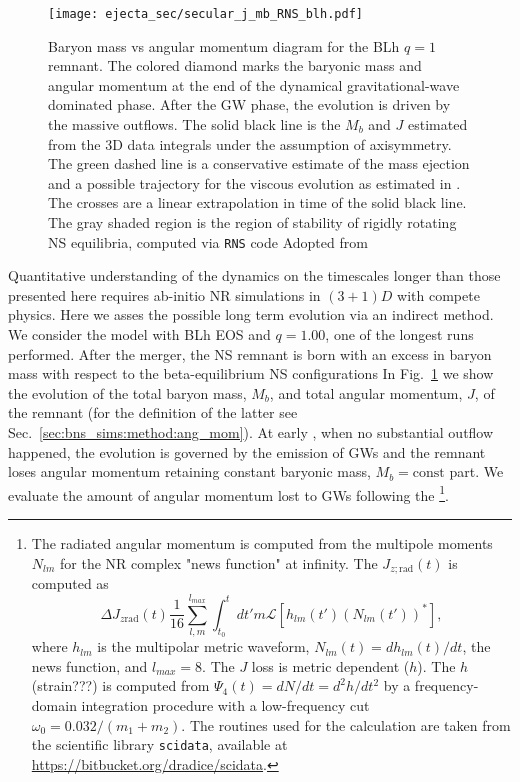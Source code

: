 \begin{figure}[t]
    \centering 
    \texttt{[image: ejecta\_sec/secular\_j\_mb\_RNS\_blh.pdf]}
    \caption{Baryon mass vs angular momentum diagram for the BLh $q=1$ remnant.
        The colored diamond marks the baryonic mass and angular momentum at the end
        of the dynamical gravitational-wave dominated phase.
        After the GW phase, the evolution is driven by the massive outflows.
        The solid black line is the $M_b$ and $J$ estimated from the 3D data
        integrals under the assumption of axisymmetry.
        The green dashed line is a conservative estimate
        of the mass ejection and a possible trajectory for the viscous
        evolution as estimated in \citet{Radice:2018xqa}. The crosses are
        a linear extrapolation in time of the solid black line. The gray
        shaded region is the region of stability of rigidly rotating NS equilibria,
        computed via \texttt{RNS} code
        Adopted from \cite{Nedora:2020pak}
    }
    \label{fig:total_j_mb_rns_blh}
\end{figure}
Quantitative understanding of the \pmerg{} dynamics on the timescales 
longer than those presented here requires ab-initio \ac{NR} simulations in 
$(3+1)D$ with compete physics.
%
Here we asses the possible long term evolution via an indirect method.
We consider the model with BLh \ac{EOS} and $q=1.00$, one of the longest runs 
performed. 
%
After the merger, the \ac{NS} remnant is born with an excess in baryon mass
with respect to the beta-equilibrium \ac{NS} configurations
%
In Fig.~\ref{fig:total_j_mb_rns_blh} we show the evolution of the 
total baryon mass, $M_b$, and total angular momentum, $J$, of the remnant
(for the definition of the latter see Sec.~\ref{sec:bns_sims:method:ang_mom}).
%
At early \pmerg{}, when no substantial outflow happened, the 
evolution is governed by the emission of \acp{GW} and the remnant loses 
angular momentum retaining constant baryonic mass, $M_b=\text{const}$ part.
%
We evaluate the amount of angular momentum lost to \acp{GW} following the 
\citet{Damour:2011fu,Bernuzzi:2012ci,Bernuzzi:2015rla}\footnote{
    The radiated angular momentum is computed from the 
    multipole moments $N_{lm}$ for the \ac{NR} complex "news function" at infinity. 
    The $J_{z;\text{rad}}(t)$ is computed as \citep{Damour:2011fu} 
    \begin{equation*}
    \Delta J_{z\text{rad}}(t) \frac{1}{16}\sum_{l,m}^{l_{max}}\int_{t_0}^{t} dt' m \mathcal{L}[h_{lm}(t')(N_{lm}(t'))^*],
    \end{equation*}
    where $h_{lm}$ is the multipolar metric waveform, 
    $N_{lm}(t) = dh_{lm}(t) / dt$, the news function, and $l_{max}=8$.
    The $J$ loss is metric dependent ($h$).
    The $h$ (strain???) is computed from $\Psi_4(t) = dN/dt = d^2h/dt^2$ by a 
    frequency-domain integration procedure with a low-frequency cut 
    $\omega_0 = 0.032/(m_1+m_2)$.
    The routines used for the calculation are taken from the scientific library
    \texttt{scidata}, available at \url{https://bitbucket.org/dradice/scidata}.
}.
